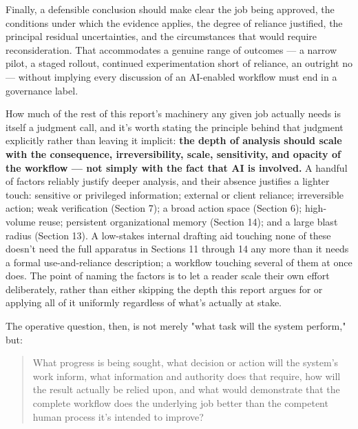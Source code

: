 Finally, a defensible conclusion should make clear the job being approved, the conditions under which the evidence applies, the degree of reliance justified, the principal residual uncertainties, and the circumstances that would require reconsideration. That accommodates a genuine range of outcomes --- a narrow pilot, a staged rollout, continued experimentation short of reliance, an outright no --- without implying every discussion of an AI-enabled workflow must end in a governance label.

How much of the rest of this report's machinery any given job actually needs is itself a judgment call, and it's worth stating the principle behind that judgment explicitly rather than leaving it implicit: \textbf{the depth of analysis should scale with the consequence, irreversibility, scale, sensitivity, and opacity of the workflow --- not simply with the fact that AI is involved.} A handful of factors reliably justify deeper analysis, and their absence justifies a lighter touch: sensitive or privileged information; external or client reliance; irreversible action; weak verification (Section 7); a broad action space (Section 6); high-volume reuse; persistent organizational memory (Section 14); and a large blast radius (Section 13). A low-stakes internal drafting aid touching none of these doesn't need the full apparatus in Sections 11 through 14 any more than it needs a formal use-and-reliance description; a workflow touching several of them at once does. The point of naming the factors is to let a reader scale their own effort deliberately, rather than either skipping the depth this report argues for or applying all of it uniformly regardless of what's actually at stake.

The operative question, then, is not merely "what task will the system perform," but:

\begin{quote}
What progress is being sought, what decision or action will the system's work inform, what information and authority does that require, how will the result actually be relied upon, and what would demonstrate that the complete workflow does the underlying job better than the competent human process it's intended to improve?

\end{quote}

